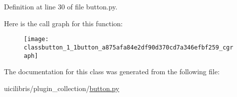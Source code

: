 \-Definition at line 30 of file button.\-py.



\-Here is the call graph for this function\-:
\nopagebreak
\begin{figure}[H]
\begin{center}
\leavevmode
\texttt{[image: classbutton\_1\_1button\_a875afa84e2df90d370cd7a346efbf259\_cgraph]}
\end{center}
\end{figure}




\-The documentation for this class was generated from the following file\-:\begin{DoxyCompactItemize}
\item 
uicilibris/plugin\-\_\-collection/\hyperlink{button_8py}{button.\-py}\end{DoxyCompactItemize}
